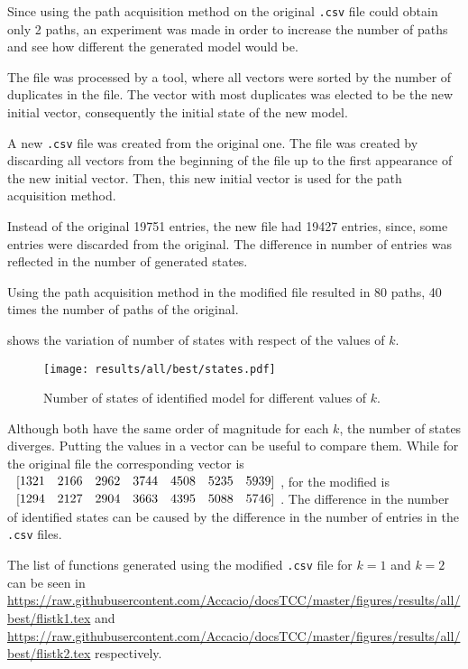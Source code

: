 Since using the path acquisition method on the original \verb|.csv| file could obtain only 2 paths, an
experiment was made in order to increase the number of paths and see how
different the generated model would be.

The file was processed by a tool, where all vectors
were sorted by the number of duplicates in the file. The vector with most
duplicates was elected to be the new initial vector, consequently the initial
state of the new model.

A new \verb|.csv| file was created from the original one. The file was created by
discarding all vectors from the beginning of the file up to the
first appearance of the new initial vector. Then, this new initial vector is used
for the path acquisition method.

Instead of the original 19751 entries, the new
file 
had 19427 entries, since, some entries were discarded from the original. The difference in number of entries was reflected in the number of
generated states.

Using the path acquisition method in the modified file resulted in 80 paths, 40 times the
number of paths of the original.  

shows the variation of number of states with respect of the values of $k$.
\begin{figure}[H]
  \centering
  \texttt{[image: results/all/best/states.pdf]}
  \caption{Number of states of identified model for different values of $k$.}
    \label{fig:statesIdentBest}
\end{figure}
Although both  have the same order of magnitude for
each $k$, the number of states diverges. Putting the values in a vector can be
useful to
compare them. While for the original file the corresponding vector is
$\colvec{1321& 2166& 2962& 3744& 4508& 5235& 5939}$, for the modified is 
$\colvec{1294& 2127& 2904& 3663& 4395& 5088& 5746}$.
The difference in the number of identified states can be caused by the difference in the number of entries
in the \verb|.csv| files.

 The list of \ffunction{} functions generated using the modified \verb|.csv| file
for $k=1$ and \mbox{$k=2$}
can be seen in  
\url{https://raw.githubusercontent.com/Accacio/docsTCC/master/figures/results/all/best/flistk1.tex}
and
\url{https://raw.githubusercontent.com/Accacio/docsTCC/master/figures/results/all/best/flistk2.tex}
respectively.

